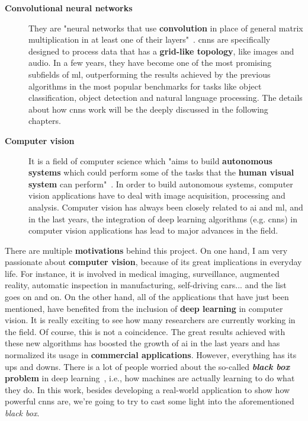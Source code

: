 \begin{description}
	\item[\textbf{Convolutional neural networks}] They are "neural networks that use \textbf{convolution} in place of general matrix multiplication in at least one of their layers"~\cite{Goodfellow-et-al-2016}. \glspl{cnn} are specifically designed to process data that has a \textbf{grid-like topology}, like images and audio. In a few years, they have become one of the most promising subfields of \gls{ml}, outperforming the results achieved by the previous algorithms in the most popular benchmarks for tasks like object classification, object detection and natural language processing. The details about how \glspl{cnn} work will be the deeply discussed in the following chapters.
\end{description}

\begin{description}
	\item[\textbf{Computer vision}] It is a field of computer science which "aims to build \textbf{autonomous systems} which could perform some of the tasks that the \textbf{human visual system} can perform"~\cite{huang1996computer}. In order to build autonomous systems, computer vision applications have to deal with image acquisition, processing and analysis. Computer vision has always been closely related to \gls{ai} and \gls{ml}, and in the last years, the integration of deep learning algorithms (e.g. \glspl{cnn}) in computer vision applications has lead to major advances in the field.
\end{description}

There are multiple \textbf{motivations} behind this project. On one hand, I am very passionate about \textbf{computer vision}, because of its great implications in everyday life. For instance, it is involved in medical imaging, surveillance, augmented reality, automatic inspection in manufacturing, self-driving cars... and the list goes on and on. On the other hand, all of the applications that have just been mentioned, have benefited from the inclusion of \textbf{deep learning} in computer vision. It is really exciting to see how many researchers are currently working in the field. Of course, this is not a coincidence. The great results achieved with these new algorithms has boosted the growth of \gls{ai} in the last years and has normalized its usage in \textbf{commercial applications}. However, everything has its ups and downs. There is a lot of people worried about the so-called \textbf{\textit{black box} problem} in deep learning~\cite{black-box}, i.e., how machines are actually learning to do what they do. In this work, besides developing a real-world application to show how powerful \glspl{cnn} are, we're going to try to cast some light into the aforementioned \textit{black box}. 

